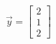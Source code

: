 \documentclass[preview]{standalone}
\begin{document}
\begin{align*}
\vec{y} = \begin{bmatrix} 2 \\ 1 \\ 2 \end{bmatrix}
\end{align*}
\end{document}
